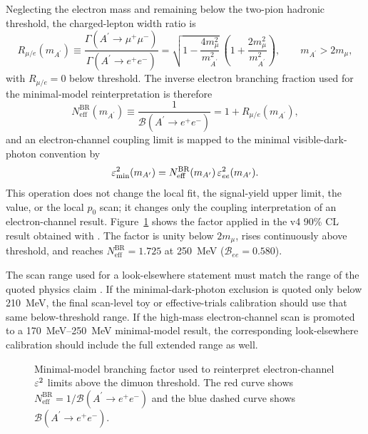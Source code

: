 Neglecting the electron mass and remaining below the two-pion hadronic threshold, the
charged-lepton width ratio is
\begin{equation}
R_{\mu/e}(m_{A^\prime})
\equiv
\frac{\Gamma(A^\prime\to\mu^+\mu^-)}
{\Gamma(A^\prime\to e^+e^-)}
=
\sqrt{1-\frac{4m_\mu^2}{m_{A^\prime}^2}}\,
\left(1+\frac{2m_\mu^2}{m_{A^\prime}^2}\right),
\qquad m_{A^\prime}>2m_\mu,
\label{eq:dimuon-width-ratio}
\end{equation}
with $R_{\mu/e}=0$ below threshold. The inverse electron branching fraction used for
the minimal-model reinterpretation is therefore
\begin{equation}
N_{\mathrm{eff}}^{\mathrm{BR}}(m_{A^\prime})
\equiv
\frac{1}{\mathcal{B}(A^\prime\to e^+e^-)}
=
1+R_{\mu/e}(m_{A^\prime}),
\label{eq:dimuon-neff}
\end{equation}
and an electron-channel coupling limit is mapped to the minimal visible-dark-photon
convention by
\begin{equation}
\varepsilon^2_{\mathrm{min}}(m_{A^\prime})
=
N_{\mathrm{eff}}^{\mathrm{BR}}(m_{A^\prime})\,\varepsilon^2_{ee}(m_{A^\prime}).
\label{eq:dimuon-eps2-map}
\end{equation}
This operation does not change the local fit, the signal-yield upper limit, the
\CLs{} value, or the local $p_0$ scan; it changes only the coupling interpretation of
an electron-channel result. Figure~\ref{fig:methodology-dimuon-factor} shows the
factor applied in the v4 90\% CL result obtained with \CLs{}. The factor is unity below
$2m_\mu$, rises continuously above threshold, and reaches
$N_{\mathrm{eff}}^{\mathrm{BR}}=1.725$ at \SI{250}{MeV}
($\mathcal{B}_{ee}=0.580$).

The scan range used for a look-elsewhere statement must match the range of the quoted
physics claim \cite{GrossVitells2010}. If the minimal-dark-photon exclusion is quoted
only below \SI{210}{MeV}, the final scan-level toy or effective-trials calibration
should use that same below-threshold range. If the high-mass electron-channel scan is
promoted to a \SIrange{170}{250}{MeV} minimal-model result, the corresponding
look-elsewhere calibration should include the full extended range as well.

\begin{figure}[H]
\centering
{}
\caption{Minimal-model branching factor used to reinterpret electron-channel
$\varepsilon^2$ limits above the dimuon threshold. The red curve shows
$N_{\mathrm{eff}}^{\mathrm{BR}}=1/\mathcal{B}(A^\prime\to e^+e^-)$ and the blue dashed
curve shows $\mathcal{B}(A^\prime\to e^+e^-)$.}
\label{fig:methodology-dimuon-factor}
\end{figure}
